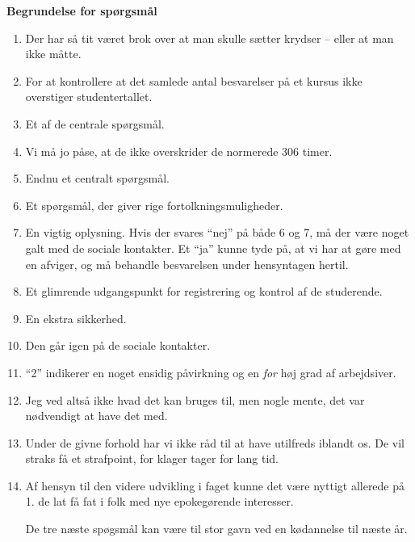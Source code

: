 \documentclass[a4paper,11pt]{article}
\begin{document}
\begin{sketch}
{\bf Begrundelse for spørgsmål}

\begin{enumerate}
\item Der har så tit været brok over at man skulle sætter krydser -- eller at man ikke måtte.

\item For at kontrollere at det samlede antal besvarelser på et kursus
  ikke overstiger studentertallet.

\item Et af de centrale spørgsmål.

\item Vi må jo påse, at de ikke overskrider de normerede 306 timer.

\item Endnu et centralt spørgsmål.

\item Et spørgsmål, der giver rige fortolkningsmuligheder.

\item En vigtig oplysning.  Hvis der svares "`nej"' på både 6 og 7, må
  der være noget galt med de sociale kontakter.  Et "`ja"' kunne tyde
  på, at vi har at gøre med en afviger, og må behandle besvarelsen
  under hensyntagen hertil.

\item Et glimrende udgangspunkt for registrering og kontrol af de studerende.

\item En ekstra sikkerhed.

\item Den går igen på de sociale kontakter.

\item "`2"' indikerer en noget ensidig påvirkning og en {\em for} høj
  grad af arbejdsiver.

\item Jeg ved altså ikke hvad det kan bruges til, men nogle mente, det
  var nødvendigt at have det med.

\item Under de givne forhold har vi ikke råd til at have utilfreds
  iblandt os.  De vil straks få et strafpoint, for klager tager for
  lang tid.

\item Af hensyn til den videre udvikling i faget kunne det være
  nyttigt allerede på 1. de lat få fat i folk med nye epokegørende
  interesser.

  \noindent De tre næste spøgsmål kan være til stor gavn ved en
  kødannelse til næste år.


\end{enumerate}
\end{sketch}
\end{document}
